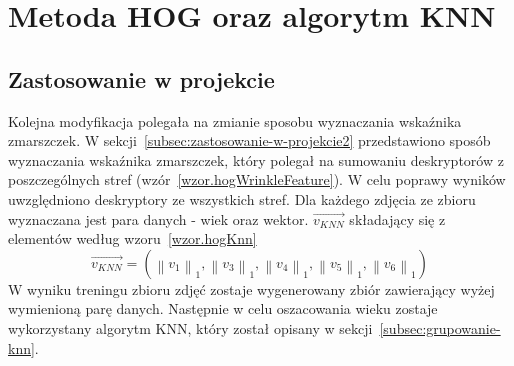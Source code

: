\documentclass[a4paper,twoside,12pt]{book}
\begin{document}
    \section{Metoda HOG oraz algorytm KNN}\label{sec:metoda-hog-oraz-algorytm-knn}
    \subsection{Zastosowanie w projekcie}\label{subsec:zastosowanie-w-projekcie}
    Kolejna modyfikacja polegała na zmianie sposobu wyznaczania wskaźnika zmarszczek.
    W sekcji~\ref{subsec:zastosowanie-w-projekcie2} przedstawiono sposób wyznaczania wskaźnika zmarszczek,
    który polegał na sumowaniu deskryptorów z poszczególnych stref (wzór~\ref{wzor.hogWrinkleFeature}).
    W celu poprawy wyników uwzględniono deskryptory ze wszystkich stref.
    Dla każdego zdjęcia ze zbioru wyznaczana jest para danych - wiek oraz wektor.
    $\overrightarrow{v_{KNN}}$ składający się z elementów według wzoru~\ref{wzor.hogKnn}
    \large
    \begin{equation}
        \overrightarrow{v_{KNN}} = (\left \|v_{1}  \right \|_{1},\left \|v_{3}  \right \|_{1},\left \|v_{4}  \right
        \|_{1},\left \|v_{5}  \right \|_{1},\left \|v_{6}  \right \|_{1})
        \label{wzor.hogKnn}
    \end{equation}
    \normalsize
    W wyniku treningu zbioru zdjęć zostaje wygenerowany zbiór zawierający wyżej wymienioną parę danych.
    Następnie w celu oszacowania wieku zostaje wykorzystany algorytm KNN, który został opisany w
    sekcji~\ref{subsec:grupowanie-knn}.
\end{document}
